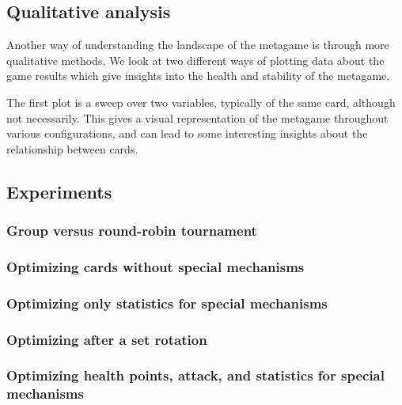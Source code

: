 \subsection{Qualitative analysis}


Another way of understanding the landscape of the metagame is through more qualitative methods. We look at two different ways of plotting data about the game results which give insights into the health and stability of the metagame. 

The first plot is a sweep over two variables, typically of the same card, although not necessarily. This gives a visual representation of the metagame throughout various configurations, and can lead to some interesting insights about the relationship between cards. 



\subsection{Experiments}

\subsubsection{Group versus round-robin tournament}


\subsubsection{Optimizing cards without special mechanisms}

\subsubsection{Optimizing only statistics for special mechanisms}

\subsubsection{Optimizing after a set rotation}

\subsubsection{Optimizing health points, attack, and statistics for special mechanisms}

